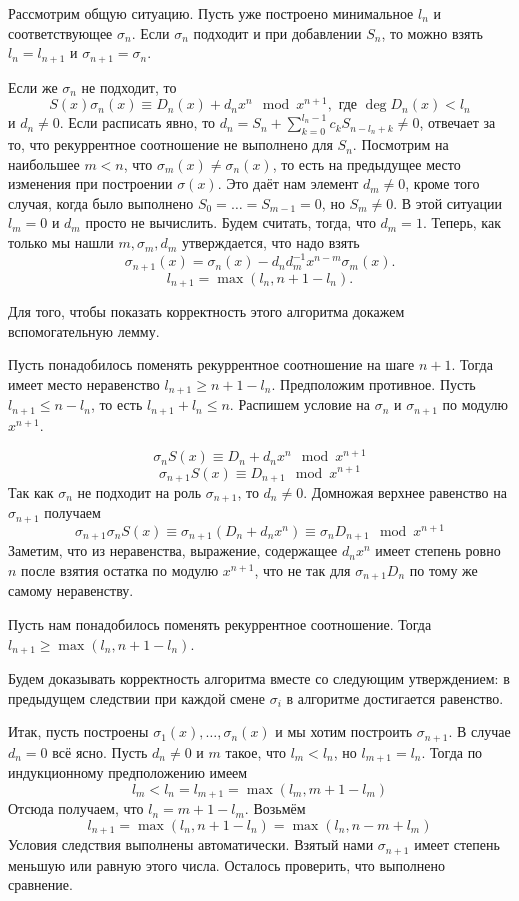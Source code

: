 Рассмотрим общую ситуацию. Пусть уже построено минимальное $l_n$ и соответствующее $\sigma_n$. Если $\sigma_n$ подходит и при добавлении $S_n$, то можно взять $l_n=l_{n+1}$ и $\sigma_{n+1}=\sigma_n$. 

Если же $\sigma_n$ не подходит, то
$$ S(x)\sigma_n(x) \equiv D_n(x)+d_nx^n \mod x^{n+1}, \text{ где } \deg D_n(x) < l_n$$
и $d_n\neq 0$. Если расписать явно, то $d_n=S_n+\sum_{k=0}^{l_n-1} c_k S_{n-l_n+k} \neq 0$, отвечает за то, что рекуррентное соотношение не выполнено для $S_n$. Посмотрим на наибольшее $m<n$, что $\sigma_m(x)\neq \sigma_n(x)$, то есть на предыдущее место изменения при построении $\sigma(x)$. Это даёт нам элемент $d_m\neq 0$, кроме того случая, когда было выполнено $S_0=\dots=S_{m-1}=0$, но $S_m\neq 0$. В этой ситуации $l_m=0$ и $d_m$ просто не вычислить. Будем считать, тогда, что $d_m=1$. Теперь, как только мы нашли $m,\sigma_m,d_m$ утверждается, что надо взять 
$$\sigma_{n+1}(x)= \sigma_n(x) - d_n d_m^{-1} x^{n-m} \sigma_m(x).$$
$$l_{n+1}=\max(l_n,n+1-l_n).$$

Для того, чтобы показать корректность этого алгоритма докажем вспомогательную лемму.

\lm[Ключевая] Пусть понадобилось поменять рекуррентное соотношение на шаге $n+1$. Тогда имеет место неравенство $l_{n+1}\geq n+1-l_n$. 
\elm
\proof  Предположим противное. Пусть $l_{n+1}\leq n-l_n$, то есть $l_{n+1}+l_n\leq n$. Распишем условие на $\sigma_n$ и $\sigma_{n+1}$ по модулю $x^{n+1}$.

$$\sigma_n S(x) \equiv D_n+d_nx^n \mod x^{n+1}$$
$$\sigma_{n+1}S(x)\equiv D_{n+1} \mod x^{n+1}$$
Так как $\sigma_n$ не подходит на роль $\sigma_{n+1}$, то $d_n\neq 0$. Домножая верхнее равенство на $\sigma_{n+1}$ получаем
$$ \sigma_{n+1}\sigma_n S(x) \equiv \sigma_{n+1}(D_n+d_nx^n) \equiv \sigma_n D_{n+1}\mod x^{n+1}$$
Заметим, что из неравенства, выражение, содержащее $d_nx^n$ имеет степень ровно $n$ после взятия остатка по модулю $x^{n+1}$, что не так для $\sigma_{n+1}D_n$ по тому же самому неравенству.
\endproof


\crl Пусть нам понадобилось поменять рекуррентное соотношение. Тогда $l_{n+1}\geq \max (l_n, n+1-l_n)$.
\ecrl

Будем доказывать корректность алгоритма вместе со следующим утверждением: в предыдущем следствии при каждой смене $\sigma_i$ в алгоритме достигается равенство. 

Итак, пусть построены $\sigma_1(x),\dots, \sigma_n(x)$ и мы хотим построить $\sigma_{n+1}$.
В случае $d_n=0$ всё ясно. Пусть $d_n \neq 0$ и $m$ такое, что $l_m<l_n$, но $l_{m+1}=l_n$. Тогда по индукционному предположению имеем 
$$l_m<l_n = l_{m+1}=\max (l_m,m+1-l_m) $$
Отсюда получаем, что $l_n=m+1-l_m$. Возьмём
$$l_{n+1}=\max (l_n,n+1-l_n)=\max (l_n,n-m+l_m)$$
Условия следствия выполнены автоматически. Взятый нами $\sigma_{n+1}$ имеет степень меньшую или равную этого числа. Осталось проверить, что выполнено сравнение. 

